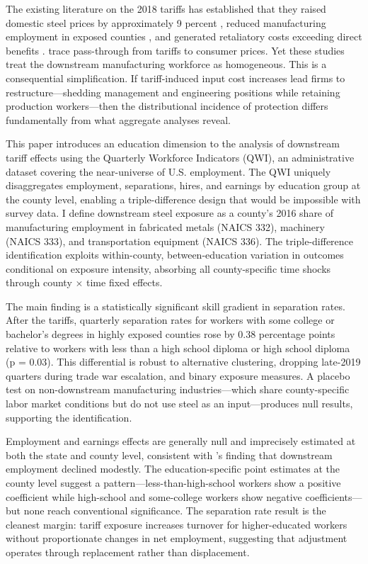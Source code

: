 \documentclass[12pt]{article}
\begin{document}
The existing literature on the 2018 tariffs has established that they raised domestic steel prices by approximately 9 percent \citep{amiti2019}, reduced manufacturing employment in exposed counties \citep{flaaen2019}, and generated retaliatory costs exceeding direct benefits \citep{fajgelbaum2020}. \citet{cavallo2021} trace pass-through from tariffs to consumer prices. Yet these studies treat the downstream manufacturing workforce as homogeneous. This is a consequential simplification. If tariff-induced input cost increases lead firms to restructure---shedding management and engineering positions while retaining production workers---then the distributional incidence of protection differs fundamentally from what aggregate analyses reveal.

This paper introduces an education dimension to the analysis of downstream tariff effects using the Quarterly Workforce Indicators (QWI), an administrative dataset covering the near-universe of U.S. employment. The QWI uniquely disaggregates employment, separations, hires, and earnings by education group at the county level, enabling a triple-difference design that would be impossible with survey data. I define downstream steel exposure as a county's 2016 share of manufacturing employment in fabricated metals (NAICS 332), machinery (NAICS 333), and transportation equipment (NAICS 336). The triple-difference identification exploits within-county, between-education variation in outcomes conditional on exposure intensity, absorbing all county-specific time shocks through county $\times$ time fixed effects.

The main finding is a statistically significant skill gradient in separation rates. After the tariffs, quarterly separation rates for workers with some college or bachelor's degrees in highly exposed counties rose by 0.38 percentage points relative to workers with less than a high school diploma or high school diploma (p = 0.03). This differential is robust to alternative clustering, dropping late-2019 quarters during trade war escalation, and binary exposure measures. A placebo test on non-downstream manufacturing industries---which share county-specific labor market conditions but do not use steel as an input---produces null results, supporting the identification.

Employment and earnings effects are generally null and imprecisely estimated at both the state and county level, consistent with \citet{flaaen2019}'s finding that downstream employment declined modestly. The education-specific point estimates at the county level suggest a pattern---less-than-high-school workers show a positive coefficient while high-school and some-college workers show negative coefficients---but none reach conventional significance. The separation rate result is the cleanest margin: tariff exposure increases turnover for higher-educated workers without proportionate changes in net employment, suggesting that adjustment operates through replacement rather than displacement.
\end{document}
